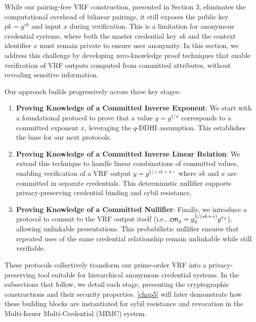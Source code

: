 While our pairing-free VRF construction, presented in Section 3, eliminates the computational overhead of bilinear pairings, it still exposes the public key $pk = g^{sk}$ and input $x$ during verification. This is a limitation for anonymous credential systems, where both the master credential key $sk$ and the context identifier $x$ must remain private to ensure user anonymity. In this section, we address this challenge by developing zero-knowledge proof techniques that enable verification of VRF outputs computed from committed attributes, without revealing sensitive information.



Our approach builds progressively across three key stages:

\begin{enumerate}
    \item \textbf{Proving Knowledge of a Committed Inverse Exponent}: We start with a foundational protocol to prove that a value $y = g^{1/x}$ corresponds to a committed exponent $x$, leveraging the $q$-DDHI assumption. This establishes the base for our next protocols.

    \item \textbf{Proving Knowledge of a Committed Inverse Linear Relation}: We extend this technique to handle linear combinations of committed values, enabling verification of a VRF output $y = g^{1/(sk + x)}$ where $sk$ and $x$ are committed in separate credentials. This deterministic nullifier supports privacy-preserving credential binding and sybil resistance.

    \item \textbf{Proving Knowledge of a Committed Nullifier}: Finally, we introduce a protocol to commit to the VRF output itself (i.e., $\mathsf{cm}_y = g_3^{1/(sk + x)} g^{r_3}$), allowing unlinkable presentations. This probabilistic nullifier ensures that repeated uses of the same credential relationship remain unlinkable while still verifiable.
\end{enumerate}

These protocols collectively transform our prime-order VRF into a privacy-preserving tool suitable for hierarchical anonymous credential systems. In the subsections that follow, we detail each stage, presenting the cryptographic constructions and their security properties. \ref{chap5} will later demonstrate how these building blocks are instantiated for sybil resistance and revocation in the Multi-Issuer Multi-Credential (MIMC) system.







